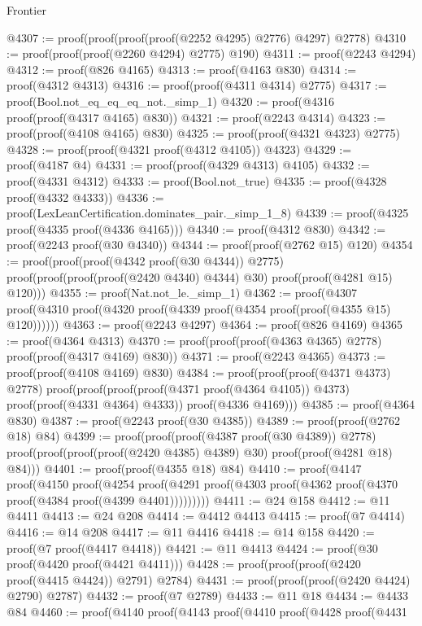 \begin{lexlean}{Frontier}
\begin{coremodule}
@4307 := proof(proof(proof(proof(@2252 @4295) @2776) @4297) @2778)
@4310 := proof(proof(proof(@2260 @4294) @2775) @190)
@4311 := proof(@2243 @4294)
@4312 := proof(@826 @4165)
@4313 := proof(@4163 @830)
@4314 := proof(@4312 @4313)
@4316 := proof(proof(@4311 @4314) @2775)
@4317 := proof(Bool.not_eq_eq_eq_not._simp_1)
@4320 := proof(@4316 proof(proof(@4317 @4165) @830))
@4321 := proof(@2243 @4314)
@4323 := proof(proof(@4108 @4165) @830)
@4325 := proof(proof(@4321 @4323) @2775)
@4328 := proof(proof(@4321 proof(@4312 @4105)) @4323)
@4329 := proof(@4187 @4)
@4331 := proof(proof(@4329 @4313) @4105)
@4332 := proof(@4331 @4312)
@4333 := proof(Bool.not_true)
@4335 := proof(@4328 proof(@4332 @4333))
@4336 := proof(LexLeanCertification.dominates_pair._simp_1_8)
@4339 := proof(@4325 proof(@4335 proof(@4336 @4165)))
@4340 := proof(@4312 @830)
@4342 := proof(@2243 proof(@30 @4340))
@4344 := proof(proof(@2762 @15) @120)
@4354 := proof(proof(proof(@4342 proof(@30 @4344)) @2775)
      proof(proof(proof(proof(@2420 @4340) @4344) @30) proof(proof(@4281 @15) @120)))
@4355 := proof(Nat.not_le._simp_1)
@4362 := proof(@4307
      proof(@4310 proof(@4320 proof(@4339 proof(@4354 proof(proof(@4355 @15) @120))))))
@4363 := proof(@2243 @4297)
@4364 := proof(@826 @4169)
@4365 := proof(@4364 @4313)
@4370 := proof(proof(proof(@4363 @4365) @2778) proof(proof(@4317 @4169) @830))
@4371 := proof(@2243 @4365)
@4373 := proof(proof(@4108 @4169) @830)
@4384 := proof(proof(proof(@4371 @4373) @2778)
      proof(proof(proof(proof(@4371 proof(@4364 @4105)) @4373) proof(proof(@4331 @4364) @4333))
          proof(@4336 @4169)))
@4385 := proof(@4364 @830)
@4387 := proof(@2243 proof(@30 @4385))
@4389 := proof(proof(@2762 @18) @84)
@4399 := proof(proof(proof(@4387 proof(@30 @4389)) @2778)
      proof(proof(proof(proof(@2420 @4385) @4389) @30) proof(proof(@4281 @18) @84)))
@4401 := proof(proof(@4355 @18) @84)
@4410 := proof(@4147
      proof(@4150
          proof(@4254
              proof(@4291 proof(@4303 proof(@4362 proof(@4370 proof(@4384 proof(@4399 @4401)))))))))
@4411 := @24 @158
@4412 := @11 @4411
@4413 := @24 @208
@4414 := @4412 @4413
@4415 := proof(@7 @4414)
@4416 := @14 @208
@4417 := @11 @4416
@4418 := @14 @158
@4420 := proof(@7 proof(@4417 @4418))
@4421 := @11 @4413
@4424 := proof(@30 proof(@4420 proof(@4421 @4411)))
@4428 := proof(proof(proof(@2420 proof(@4415 @4424)) @2791) @2784)
@4431 := proof(proof(proof(@2420 @4424) @2790) @2787)
@4432 := proof(@7 @2789)
@4433 := @11 @18
@4434 := @4433 @84
@4460 := proof(@4140
      proof(@4143
          proof(@4410
              proof(@4428
                  proof(@4431

\end{coremodule}
\end{lexlean}
